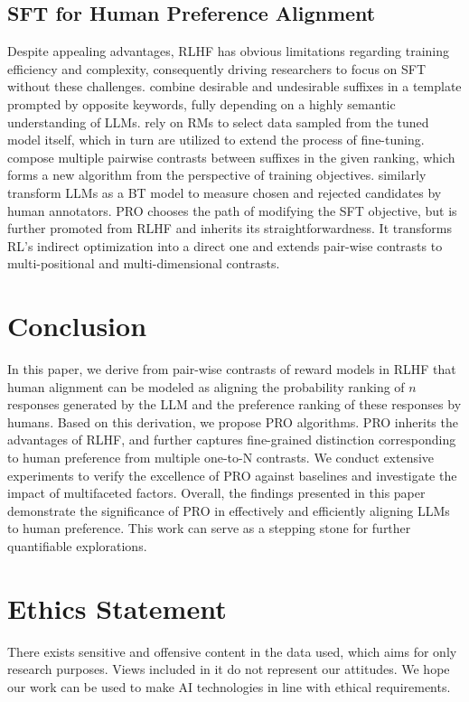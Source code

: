 \subsection{SFT for Human Preference Alignment} Despite appealing advantages, RLHF has obvious limitations regarding training efficiency and complexity, consequently driving researchers to focus on SFT without these challenges. \citet{liu2023languages} combine desirable and undesirable suffixes in a template prompted by opposite keywords, fully depending on a highly semantic understanding of LLMs. 
\citet{dong2023raft} rely on RMs to select data sampled from the tuned model itself, which in turn are utilized to extend the process of fine-tuning.
\citet{yuan2023rrhf} compose multiple pairwise contrasts between suffixes in the given ranking, which forms a new algorithm from the perspective of training objectives. 
\citet{rafailov2023direct} similarly transform LLMs as a BT model to measure chosen and rejected candidates by human annotators. PRO chooses the path of modifying the SFT objective, but is further promoted from RLHF and inherits its straightforwardness. It transforms RL's indirect optimization into a direct one and extends pair-wise contrasts to multi-positional and multi-dimensional contrasts.

\section{Conclusion}
In this paper, we derive from pair-wise contrasts of reward models in RLHF that human alignment can be modeled as aligning the probability ranking of $n$ responses generated by the LLM and the preference ranking of these responses by humans. Based on this derivation, we propose PRO algorithms. PRO inherits the advantages of RLHF, and further captures fine-grained distinction corresponding to human preference from multiple one-to-N contrasts. We conduct extensive experiments to verify the excellence of PRO against baselines and investigate the impact of multifaceted factors. Overall, the findings presented in this paper demonstrate the significance of PRO in effectively and efficiently aligning LLMs to human preference. This work can serve as a stepping stone for further quantifiable explorations.

\section*{Ethics Statement} There exists sensitive and offensive content in the data used, which aims for only research purposes. Views included in it do not represent our attitudes. We hope our work can be used to make AI technologies in line with ethical requirements.


